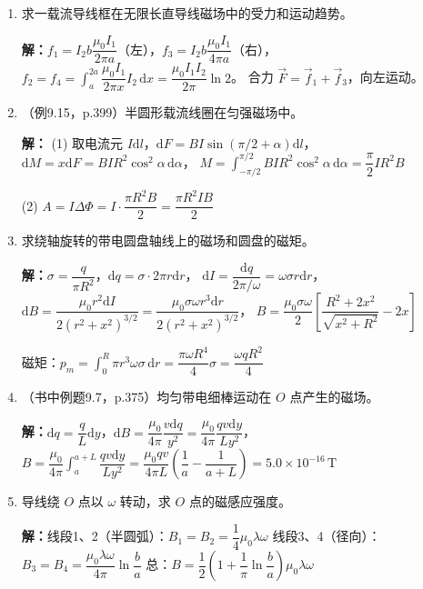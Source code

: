\documentclass{ctexart}
\begin{document}
\begin{enumerate}
\item 求一载流导线框在无限长直导线磁场中的受力和运动趋势。

\textbf{解：}$f_1 = I_2b\dfrac{\mu_0 I_1}{2\pi a}$（左），$f_3 = I_2b\dfrac{\mu_0 I_1}{4\pi a}$（右），
$f_2 = f_4 = \displaystyle\int_a^{2a} \dfrac{\mu_0 I_1}{2\pi x}I_2\,\mathrm{d}x = \dfrac{\mu_0 I_1 I_2}{2\pi}\ln 2$。
合力 $\vec{F} = \vec{f}_1 + \vec{f}_3$，向左运动。

\item（例9.15，p.399）半圆形载流线圈在匀强磁场中。

\textbf{解：}
(1) 取电流元 $I\mathrm{d}l$，$\mathrm{d}F = BI\sin(\pi/2 + \alpha)\mathrm{d}l$，
$\mathrm{d}M = x\mathrm{d}F = BIR^{2}\cos^{2}\alpha\,\mathrm{d}\alpha$，
$M = \displaystyle\int_{-\pi/2}^{\pi/2} BIR^{2}\cos^{2}\alpha\,\mathrm{d}\alpha = \dfrac{\pi}{2}IR^{2}B$

(2) $A = I\Delta\Phi = I\cdot\dfrac{\pi R^{2}B}{2} = \dfrac{\pi R^{2}IB}{2}$

\item 求绕轴旋转的带电圆盘轴线上的磁场和圆盘的磁矩。

\textbf{解：}$\sigma = \dfrac{q}{\pi R^{2}}$，$\mathrm{d}q = \sigma\cdot 2\pi r\mathrm{d}r$，
$\mathrm{d}I = \dfrac{\mathrm{d}q}{2\pi/\omega} = \omega\sigma r\mathrm{d}r$，
$\mathrm{d}B = \dfrac{\mu_0 r^{2}\mathrm{d}I}{2(r^{2}+x^{2})^{3/2}} = \dfrac{\mu_0\sigma\omega r^{3}\mathrm{d}r}{2(r^{2}+x^{2})^{3/2}}$，
$B = \dfrac{\mu_0\sigma\omega}{2}\left[\dfrac{R^{2}+2x^{2}}{\sqrt{x^{2}+R^{2}}} - 2x\right]$

磁矩：$p_m = \displaystyle\int_0^R \pi r^{3}\omega\sigma\,\mathrm{d}r = \dfrac{\pi\omega R^{4}}{4}\sigma = \dfrac{\omega qR^{2}}{4}$

\item（书中例题9.7，p.375）均匀带电细棒运动在 $O$ 点产生的磁场。

\textbf{解：}$\mathrm{d}q = \dfrac{q}{L}\mathrm{d}y$，$\mathrm{d}B = \dfrac{\mu_0}{4\pi}\dfrac{v\mathrm{d}q}{y^{2}} = \dfrac{\mu_0}{4\pi}\dfrac{qv\mathrm{d}y}{Ly^{2}}$，
$B = \dfrac{\mu_0}{4\pi}\displaystyle\int_a^{a+L} \dfrac{qv\mathrm{d}y}{Ly^{2}} = \dfrac{\mu_0 qv}{4\pi L}\left(\dfrac{1}{a} - \dfrac{1}{a+L}\right) = 5.0\times10^{-16}\,\text{T}$

\item 导线绕 $O$ 点以 $\omega$ 转动，求 $O$ 点的磁感应强度。

\textbf{解：}线段1、2（半圆弧）：$B_1 = B_2 = \dfrac14\mu_0\lambda\omega$
线段3、4（径向）：$B_3 = B_4 = \dfrac{\mu_0\lambda\omega}{4\pi}\ln\dfrac{b}{a}$
总：$B = \dfrac12\left(1 + \dfrac{1}{\pi}\ln\dfrac{b}{a}\right)\mu_0\lambda\omega$


\end{enumerate}
\end{document}
